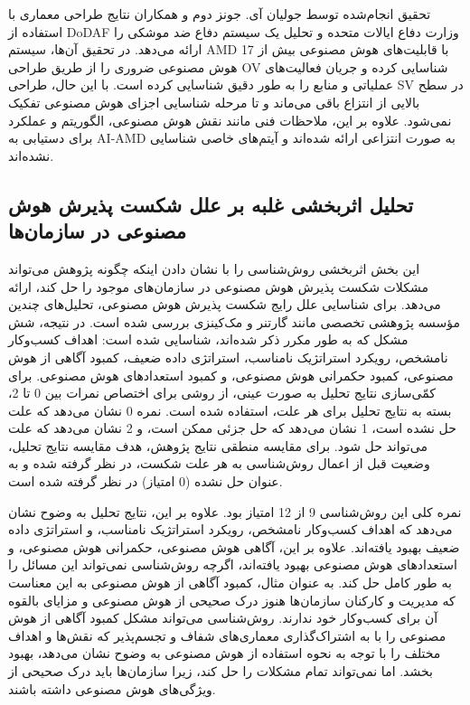 \documentclass[a4paper,10pt]{article}
\begin{document}
            تحقیق انجام‌شده توسط جولیان آی. جونز دوم و همکاران نتایج طراحی معماری با استفاده از DoDAF وزارت دفاع ایالات متحده و تحلیل یک سیستم دفاع ضد موشکی را ارائه می‌دهد. در تحقیق آن‌ها، سیستم AMD با قابلیت‌های هوش مصنوعی بیش از 17 هوش مصنوعی ضروری را از طریق طراحی OV شناسایی کرده و جریان فعالیت‌های عملیاتی و منابع را به طور دقیق شناسایی کرده است. با این حال، طراحی SV در سطح بالایی از انتزاع باقی می‌ماند و تا مرحله شناسایی اجزای هوش مصنوعی تفکیک نمی‌شود. علاوه بر این، ملاحظات فنی مانند نقش هوش مصنوعی، الگوریتم و عملکرد برای دستیابی به AI-AMD به صورت انتزاعی ارائه شده‌اند و آیتم‌های خاصی شناسایی نشده‌اند.

        \subsection{تحلیل اثربخشی غلبه بر علل شکست پذیرش هوش مصنوعی در سازمان‌ها}

            این بخش اثربخشی روش‌شناسی را با نشان دادن اینکه چگونه پژوهش می‌تواند مشکلات شکست پذیرش هوش مصنوعی در سازمان‌های موجود را حل کند، ارائه می‌دهد. برای شناسایی علل رایج شکست پذیرش هوش مصنوعی، تحلیل‌های چندین مؤسسه پژوهشی تخصصی مانند گارتنر و مک‌کینزی بررسی شده است. در نتیجه، شش مشکل که به طور مکرر ذکر شده‌اند، شناسایی شده است: اهداف کسب‌وکار نامشخص، رویکرد استراتژیک نامناسب، استراتژی داده ضعیف، کمبود آگاهی از هوش مصنوعی، کمبود حکمرانی هوش مصنوعی، و کمبود استعدادهای هوش مصنوعی. برای کمّی‌سازی نتایج تحلیل به صورت عینی، از روشی برای اختصاص نمرات بین 0 تا 2، بسته به نتایج تحلیل برای هر علت، استفاده شده است. نمره 0 نشان می‌دهد که علت حل نشده است، 1 نشان می‌دهد که حل جزئی ممکن است، و 2 نشان می‌دهد که علت می‌تواند حل شود. برای مقایسه منطقی نتایج پژوهش، هدف مقایسه نتایج تحلیل، وضعیت قبل از اعمال روش‌شناسی به هر علت شکست، در نظر گرفته شده و به عنوان حل نشده (0 امتیاز) در نظر گرفته شده است.

            نمره کلی این روش‌شناسی 9 از 12 امتیاز بود. علاوه بر این، نتایج تحلیل به وضوح نشان می‌دهد که اهداف کسب‌وکار نامشخص، رویکرد استراتژیک نامناسب، و استراتژی داده ضعیف بهبود یافته‌اند. علاوه بر این، آگاهی هوش مصنوعی، حکمرانی هوش مصنوعی، و استعدادهای هوش مصنوعی بهبود یافته‌اند، اگرچه روش‌شناسی نمی‌تواند این مسائل را به طور کامل حل کند. به عنوان مثال، کمبود آگاهی از هوش مصنوعی به این معناست که مدیریت و کارکنان سازمان‌ها هنوز درک صحیحی از هوش مصنوعی و مزایای بالقوه آن برای کسب‌وکار خود ندارند. روش‌شناسی می‌تواند مشکل کمبود آگاهی از هوش مصنوعی را با به اشتراک‌گذاری معماری‌های شفاف و تجسم‌پذیر که نقش‌ها و اهداف مختلف را با توجه به نحوه استفاده از هوش مصنوعی به وضوح نشان می‌دهد، بهبود بخشد. اما نمی‌تواند تمام مشکلات را حل کند، زیرا سازمان‌ها باید درک صحیحی از ویژگی‌های هوش مصنوعی داشته باشند.
\end{document}
